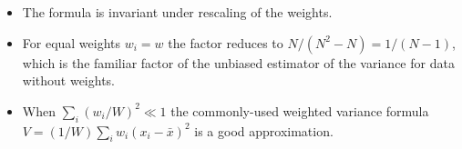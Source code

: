 \documentclass[fleqn,12pt]{article}
\begin{document}
\begin{itemize}
\item
The formula is invariant under rescaling of the weights.

\item 
For equal weights $w_i = w$ the factor reduces to $N/(N^2-N) =
1/(N-1)$, which is the familiar factor of the unbiased estimator of
the variance for data without weights.

\item
When $\sum_i (w_i/W)^2 \ll 1$ the commonly-used weighted variance
formula $V = (1/W)\sum_i w_i (x_i - \bar{x})^2$ is a good
approximation.
\end{itemize}
\end{document}
